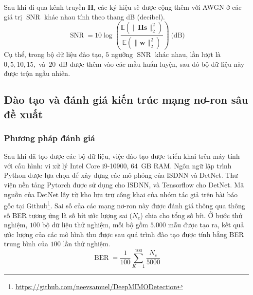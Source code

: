 Sau khi đi qua kênh truyền $\mathbf{H}$, các ký hiệu sẽ được cộng thêm với AWGN ở các giá trị $\operatorname{SNR}$ khác nhau tính theo thang dB (decibel). 
\begin{equation}
\operatorname{SNR} = 10 \log \left(\frac{\mathbb{E}\left(\|\mathbf{H s}\|_2^2\right)}{\mathbb{E}\left(\|\mathbf{w}\|_2^2\right)}\right)~\text{(dB)}
\end{equation}
Cụ thể, trong bộ dữ liệu đào tạo, $5$ ngưỡng $\operatorname{SNR}$ khác nhau, lần lượt là $0, 5, 10, 15,$ và~$20$~dB được thêm vào các mẫu huấn luyện, sau đó bộ dữ liệu này được trộn ngẫu nhiên.

\subsection{Đào tạo và đánh giá kiến trúc mạng nơ-ron sâu đề xuất}

\subsubsection*{\textbf{Phương pháp đánh giá}}

Sau khi đã tạo được các bộ dữ liệu, việc đào tạo được triển khai trên máy tính với cấu hình: vi xử lý Intel Core i9-10900, 64~GB RAM. Ngôn ngữ lập trình Python được lựa chọn để xây dựng các mô phỏng của ISDNN và DetNet. Thư viện nền tảng Pytorch được sử dụng cho ISDNN, và Tensorflow cho DetNet. Mã nguồn của DetNet lấy từ kho lưu trữ công khai của nhóm tác giả trên bài báo gốc tại Github\footnote{\url{https://github.com/neevsamuel/DeepMIMODetection}}. Sai số của các mạng nơ-ron này được đánh giá thông qua thông số BER tương ứng là số bít ước lượng sai ($N_e$) chia cho tổng số bít. Ở bước thử nghiệm, $100$ bộ dữ liệu thử nghiệm, mỗi bộ gồm $5.000$ mẫu được tạo ra, kết quả ước lượng của các mô hình thu được sau quá trình đào tạo được tính bằng BER trung bình của $100$ lần thử nghiệm.
\begin{equation}
    \operatorname{BER} = \frac{1}{100} \sum_{K=1}^{100} \frac{N_e}{5000}
\end{equation}

